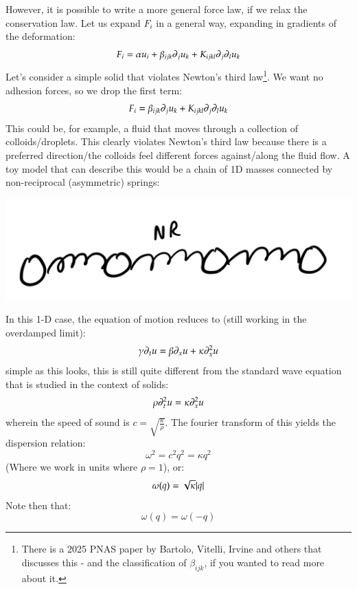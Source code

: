 However, it is possible to write a more general force law, if we relax the conservation law. Let us expand $F_i$ in a general way, expanding in gradients of the deformation:
\begin{equation}
    F_i = \alpha u_i + \beta_{ijk}\partial_j u_k + K_{ijkl}\partial_j \partial_l u_k
\end{equation}
Let's consider a simple solid that violates Newton's third law\footnote{There is a 2025 PNAS paper by Bartolo, Vitelli, Irvine and others that discusses this - and the classification of $\beta_{ijk}$, if you wanted to read more about it.}. We want no adhesion forces, so we drop the first term:
\begin{equation}
    F_i = \beta_{ijk}\partial_j u_k + K_{ijkl}\partial_j \partial_l u_k
\end{equation}
This could be, for example, a fluid that moves through a collection of colloids/droplets. This clearly violates Newton's third law because there is a preferred direction/the colloids feel different forces against/along the fluid flow. A toy model that can describe this would be a chain of 1D masses connected by non-reciprocal (asymmetric) springs:

\begin{center}
    \includegraphics[scale=0.4]{Lectures/Images/lec7-NRspringchain.png}
\end{center}

In this 1-D case, the equation of motion reduces to (still working in the overdamped limit):
\begin{equation}\label{eq:neweom}
    \gamma \partial_t u = \beta \partial_x u + \kappa \partial_x^2 u
\end{equation}
simple as this looks, this is still quite different from the standard wave equation that is studied in the context of solids:
\begin{equation}
    \rho \partial_t^2 u = \kappa \partial_x^2 u
\end{equation}
wherein the speed of sound is $c = \sqrt{\frac{\kappa}{\rho}}$. The fourier transform of this yields the dispersion relation:
\begin{equation}
    \omega^2 = c^2q^2 = \kappa q^2
\end{equation}
(Where we work in units where $\rho = 1$), or:
\begin{equation}
    \omega(q) = \sqrt{\kappa}\lvert q \rvert
\end{equation}
Note then that:
\begin{equation}
    \omega(q) = \omega(-q)
\end{equation}

